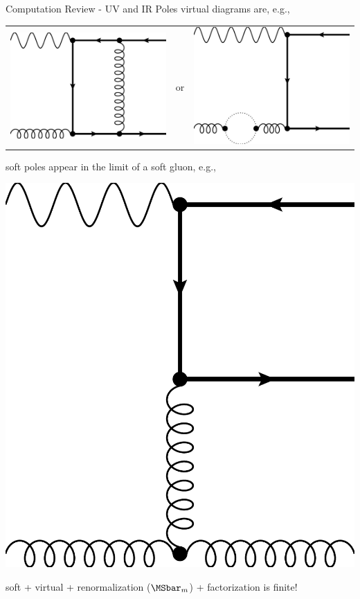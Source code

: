 \begin{frame}{Computation Review - UV and IR Poles}
virtual diagrams are, e.g.,
\begin{center}
\begin{tabular}{wnw}
\includegraphics[width=.25\textwidth]{img/nlo-v-1}
&or
&\includegraphics[width=.25\textwidth]{img/nlo-v-5}
\end{tabular}
\end{center}

soft poles appear in the limit of a soft gluon, e.g.,
\begin{center}
\includegraphics[width=.2\textwidth]{img/nlo-g-4}
\end{center}

soft + virtual + renormalization ($\MSbar_m$) + factorization is finite! 
\end{frame}

